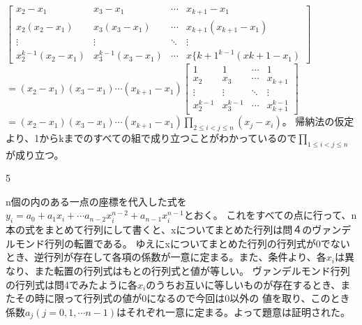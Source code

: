 \documentclass[11pt]{jsarticle}
\begin{document}
    $\left[ \begin{array}{cccc}
                x_2-x_1 & x_3-x_1 & \cdots & x_{k+1}-x_1 \\
                x_2(x_2-x_1) & x_3(x_3-x_1) & \cdots & x_{k+1}(x_{k+1} -x_1) \\
                \vdots & \vdots & \ddots & \vdots \\
                x_2^{k-1}(x_2 -x_1) & x_3^{k-1}(x_3-x_1) & \cdots & x\{k+1^{k-1}(x{k+1} -x_1)
    \end{array} \right]$
$= (x_2 -x_1)(x_3-x_1) \cdots (x_{k+1}-x_1)\left[
\begin{array}{cccc}
    1 & 1 & \cdots & 1 \\
    x_2 & x_3 & \cdots & x_{k+1} \\
    \vdots & \vdots & \ddots & \vdots \\
    x_2^{k-1} & x_3^{k-1} & \cdots & x_{k+1}^{k-1}
\end{array}
\right]$\\
    $ = (x_2-x_1)(x_3-x_1)\cdots (x_{k+1} -x_1) \prod_{2\leq i < j \leq n}(x_j-x_i)$。
    帰納法の仮定より、1からkまでのすべての組で成り立つことがわかっているので$\prod_{1\leq i < j \leq n}$が成り立つ。\\
 \par5
 \par n個の内のある一点の座標を代入した式を$y_i = a_0 + a_1 x_i + \cdots a_{n-2}x_i^{n-2}+a_{n-1}x_i^{n-1}$とおく。
    これをすべての点に行って、n本の式をまとめて行列にして書くと、xについてまとめた行列は問４のヴァンデルモンド行列の転置である。
    ゆえにxについてまとめた行列の行列式が0でないとき、逆行列が存在して各項の係数が一意に定まる。また、条件より、各$x_i$は異なり、また転置の行列式はもとの行列式と値が等しい。
    ヴァンデルモンド行列の行列式は問4でみたように各$x_i$のうちお互いに等しいものが存在するとき、またその時に限って行列式の値が0になるので今回は0以外の
    値を取り、このとき係数$a_j(j = 0,1,\cdots n-1)$はそれぞれ一意に定まる。よって題意は証明された。
\end{document}
